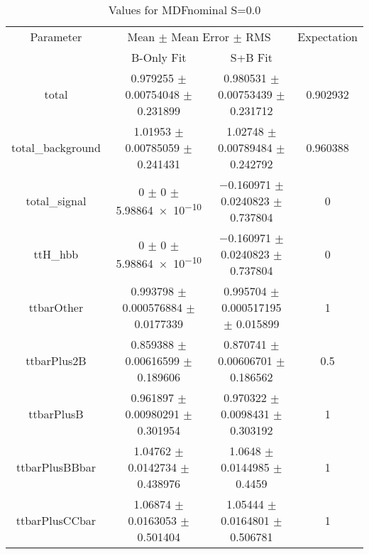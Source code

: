 \begin{table}
\centering
\caption{Values for MDFnominal S=0.0}
\begin{tabular}{cccc}
\toprule
Parameter & \multicolumn{2}{c}{Mean $\pm$ Mean Error $\pm$ RMS} & Expectation\\
 & B-Only Fit & S+B Fit & \\
\midrule
total & \num{0.979255} $\pm$ \num{0.00754048} $\pm$ \num{0.231899} & \num{0.980531} $\pm$ \num{0.00753439} $\pm$ \num{0.231712} & \num{0.902932}\\
total\_background & \num{1.01953} $\pm$ \num{0.00785059} $\pm$ \num{0.241431} & \num{1.02748} $\pm$ \num{0.00789484} $\pm$ \num{0.242792} & \num{0.960388}\\
total\_signal & \num{0} $\pm$ \num{0} $\pm$ \num{5.98864e-10} & \num{-0.160971} $\pm$ \num{0.0240823} $\pm$ \num{0.737804} & \num{0}\\
ttH\_hbb & \num{0} $\pm$ \num{0} $\pm$ \num{5.98864e-10} & \num{-0.160971} $\pm$ \num{0.0240823} $\pm$ \num{0.737804} & \num{0}\\
ttbarOther & \num{0.993798} $\pm$ \num{0.000576884} $\pm$ \num{0.0177339} & \num{0.995704} $\pm$ \num{0.000517195} $\pm$ \num{0.015899} & \num{1}\\
ttbarPlus2B & \num{0.859388} $\pm$ \num{0.00616599} $\pm$ \num{0.189606} & \num{0.870741} $\pm$ \num{0.00606701} $\pm$ \num{0.186562} & \num{0.5}\\
ttbarPlusB & \num{0.961897} $\pm$ \num{0.00980291} $\pm$ \num{0.301954} & \num{0.970322} $\pm$ \num{0.0098431} $\pm$ \num{0.303192} & \num{1}\\
ttbarPlusBBbar & \num{1.04762} $\pm$ \num{0.0142734} $\pm$ \num{0.438976} & \num{1.0648} $\pm$ \num{0.0144985} $\pm$ \num{0.4459} & \num{1}\\
ttbarPlusCCbar & \num{1.06874} $\pm$ \num{0.0163053} $\pm$ \num{0.501404} & \num{1.05444} $\pm$ \num{0.0164801} $\pm$ \num{0.506781} & \num{1}\\
\bottomrule
\end{tabular}
\end{table}